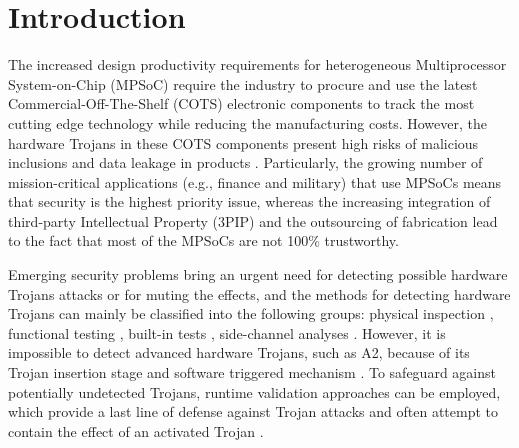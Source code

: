 \documentclass[10pt,journal]{IEEEtran}
\begin{document}
%
\IEEEpeerreviewmaketitle



\section{Introduction}

The increased design productivity requirements for heterogeneous Multiprocessor System-on-Chip (MPSoC) require the industry to procure and use the latest Commercial-Off-The-Shelf (COTS) electronic components to track the most cutting edge technology while reducing the manufacturing costs. However, the hardware Trojans in these COTS components present high risks of malicious inclusions and data leakage in products \cite{conference:XW}. Particularly, the growing number of mission-critical applications (e.g., finance and military) that use MPSoCs means that security is the highest priority issue, whereas the increasing integration of third-party Intellectual Property (3PIP) and the outsourcing of fabrication lead to the fact that most of the MPSoCs are not 100\% trustworthy.

Emerging security problems bring an urgent need for detecting possible hardware Trojans attacks or for muting the effects, and the methods for detecting hardware Trojans can mainly be classified into the following groups: physical inspection \cite{network:SS}, functional testing \cite{conference:MM}\cite{conference:BB}, built-in tests \cite{conference:KX}\cite{article:DD}, side-channel analyses \cite{article:YH1}\cite{article:LN}\cite{article:SY}. However, it is impossible to detect advanced hardware Trojans, such as A2, because of its Trojan insertion stage and software triggered mechanism \cite{conference:YH}. To safeguard against potentially undetected Trojans, runtime validation approaches can be employed, which provide a last line of defense against Trojan attacks and often attempt to contain the effect of an activated Trojan \cite{article:SB2}.

\end{document}
